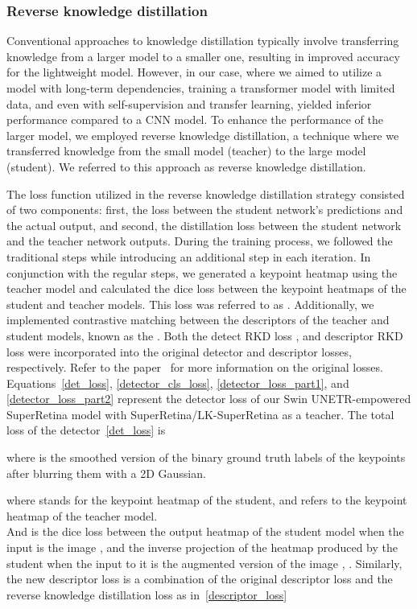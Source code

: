 \documentclass[10pt,twocolumn,letterpaper]{article}
\begin{document}
\subsubsection{Reverse knowledge distillation}
Conventional approaches to knowledge distillation typically involve transferring knowledge from a larger model to a smaller one, resulting in improved accuracy for the lightweight model. However, in our case, where we aimed to utilize a model with long-term dependencies, training a transformer model with limited data, and even with self-supervision and transfer learning, yielded inferior performance compared to a CNN model. To enhance the performance of the larger model, we employed reverse knowledge distillation, a technique where we transferred knowledge from the small model (teacher) to the large model (student). We referred to this approach as reverse knowledge distillation. 

The loss function utilized in the reverse knowledge distillation strategy consisted of two components: first, the loss between the student network's predictions and the actual output, and second, the distillation loss between the student network and the teacher network outputs. During the training process, we followed the traditional steps while introducing an additional step in each iteration. In conjunction with the regular steps, we generated a keypoint heatmap using the teacher model and calculated the dice loss between the keypoint heatmaps of the student and teacher models. This loss was referred to as . Additionally, we implemented contrastive matching between the descriptors of the teacher and student models, known as the . Both the detect RKD loss , and descriptor RKD loss  were incorporated into the original detector and descriptor losses, respectively. Refer to the paper~\cite{liu2022semi} for more information on the original losses.
Equations~\ref{det_loss}, \ref{detector_cls_loss}, \ref{detector_loss_part1}, and \ref{detector_loss_part2} represent the detector loss of our Swin UNETR-empowered SuperRetina model with SuperRetina/LK-SuperRetina as a teacher.
The total loss of the detector~\ref{det_loss} is



where  is the smoothed version of the binary ground truth labels  of the keypoints after blurring them with a 2D Gaussian.

where  stands for the keypoint heatmap of the student, and  refers to the keypoint heatmap of the teacher model.\\ 
And  is the dice loss between the output heatmap of the student model when the input is the image , and the inverse projection of the heatmap produced by the student when the input to it is the augmented version of the image  , .
Similarly, the new descriptor loss is a combination of the original descriptor loss and the reverse knowledge distillation loss as in~\ref{descriptor_loss}
\end{document}
